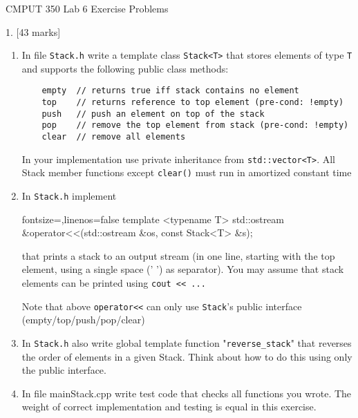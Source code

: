\documentclass[a4paper,11pt]{article}
\begin{document}

\begin{center}
{\Large CMPUT 350 Lab 6 Exercise Problems}
\end{center}



1. [43 marks] 
\begin{enumerate}[label=\alph*)]
\item In file \texttt{Stack.h} write a template class \texttt{Stack<T>} that stores elements
of type \texttt{T} and supports the following public class methods:

{\small
\begin{verbatim}
    empty  // returns true iff stack contains no element
    top    // returns reference to top element (pre-cond: !empty)
    push   // push an element on top of the stack
    pop    // remove the top element from stack (pre-cond: !empty)
    clear  // remove all elements
\end{verbatim}
}

In your implementation use private inheritance from \texttt{std::vector<T>}. All
Stack member functions except \texttt{clear()} must run in amortized constant time

\item In \texttt{Stack.h} implement
\begin{cppcode*}{fontsize=\footnotesize,linenos=false}
template <typename T>
std::ostream &operator<<(std::ostream &os, const Stack<T> &s);
\end{cppcode*}

that prints a stack to an output stream (in one line, starting with the top
element, using a single space (' ') as separator). You may assume that stack elements can be
printed using \texttt{cout << ...}

\medskip

Note that above \texttt{operator<<} can only use \texttt{Stack}'s public interface
(empty/top/push/pop/clear)

\item In \texttt{Stack.h} also write global template function "\texttt{reverse\_stack}" that
    reverses the order of elements in a given Stack.
    Think about how to do this using only the public interface.

\item In file mainStack.cpp write test code that checks all functions
    you wrote. The weight of correct implementation and testing is equal in
    this exercise.
\end{enumerate}
\end{document}
